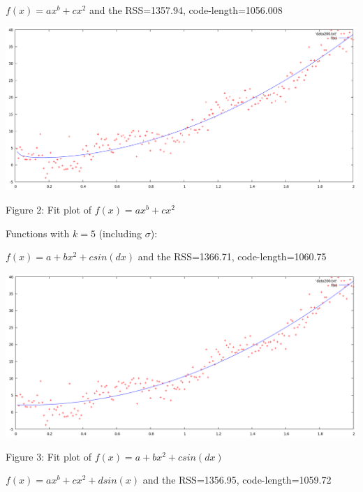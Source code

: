 \documentclass{article}
\begin{document}
$f(x)=ax^b+cx^2$ and the RSS=1357.94, code-length=1056.008

\vspace{5mm}
\begin{minipage}{0.9\textwidth}
  \includegraphics[width=\textwidth,keepaspectratio]{22.png}
  \centerline{Figure 2: Fit plot of $f(x)=ax^b+cx^2$}
\end{minipage}
\vspace{5mm}

Functions with $k=5$ (including $\sigma$):

\vspace{1mm}

$f(x)=a+bx^2+csin(dx)$ and the RSS=1366.71, code-length=1060.75

\vspace{5mm}
\begin{minipage}{0.9\textwidth}
  \includegraphics[width=\textwidth,keepaspectratio]{20.png}
  \centerline{Figure 3: Fit plot of $f(x)=a+bx^2+csin(dx)$}
\end{minipage}
\vspace{5mm}

\vspace{1mm}

$f(x)=ax^b+cx^2+dsin(x)$ and the RSS=1356.95, code-length=1059.72
\end{document}
